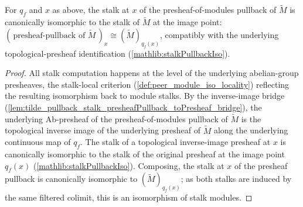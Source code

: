 \begin{lemma}
  \label{lem:tilde_pullback_stalk_presheafPullbackStalk}
  For \(q_f\) and \(x\) as above, the stalk at \(x\) of the presheaf-of-modules pullback of
  \(\widetilde M\) is canonically isomorphic to the stalk of \(\widetilde M\) at the image
  point: \((\,\text{presheaf-pullback of }\widetilde M\,)_x\cong(\widetilde M)_{q_f(x)}\),
  compatibly with the underlying topological-presheaf identification
  (\cref{mathlib:stalkPullbackIso}).
\end{lemma}

\begin{proof}
  All stalk computation happens at the level of the underlying abelian-group presheaves,
  the stalk-local criterion (\cref{def:peer_module_iso_locality}) reflecting the resulting
  isomorphism back to module stalks.  By the inverse-image bridge
  (\cref{lem:tilde_pullback_stalk_presheafPullback_toPresheaf_bridge}), the underlying
  \(\mathrm{Ab}\)-presheaf of the presheaf-of-modules pullback of \(\widetilde M\) is the
  topological inverse image of the underlying presheaf of \(\widetilde M\) along the
  underlying continuous map of \(q_f\).  The stalk of a topological inverse-image presheaf at \(x\) is
  canonically isomorphic to the stalk of the original presheaf at the image point \(q_f(x)\)
  (\cref{mathlib:stalkPullbackIso}).  Composing, the stalk at \(x\) of the presheaf pullback
  is canonically isomorphic to \((\widetilde M)_{q_f(x)}\); as both stalks are induced by the
  same filtered colimit, this is an isomorphism of stalk modules.
\end{proof}


